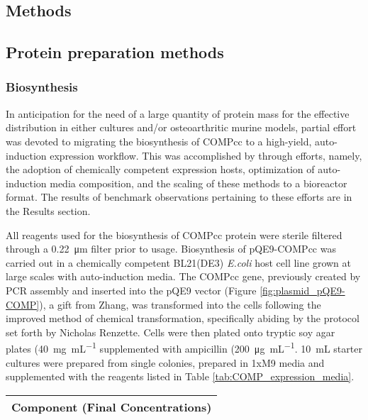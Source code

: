 \begin{refsection}
\section{Methods}

\subsection{Protein preparation methods}

\subsubsection{Biosynthesis}

In anticipation for the need of a large quantity of protein mass for the
effective distribution in either  cultures and/or 
osteoarthritic murine models, partial effort was devoted to migrating the
biosynthesis of COMPcc to a high-yield, auto-induction expression workflow. This
was accomplished by through efforts, namely, the adoption of 
chemically competent expression hosts, optimization of auto-induction media
composition, and the scaling of these methods to a bioreactor format. The
results of benchmark observations pertaining to these efforts are in the Results
section.

All reagents used for the biosynthesis of COMPcc protein were sterile filtered
through a \SI{0.22}{\um} filter prior to usage. Biosynthesis of pQE9-COMPcc was
carried out in a chemically competent BL21(DE3) \emph{E.coli} host cell line
grown at large scales with auto-induction media.  The COMPcc gene, previously
created by PCR assembly and inserted into the pQE9 vector (Figure
\ref{fig:plasmid_pQE9-COMP}), a gift from Zhang,\cite{Shen2006a} was transformed
into the cells following the improved  method of chemical
transformation, specifically abiding by the protocol set forth by Nicholas
Renzette.\cite{Renzette2011} Cells were then plated onto tryptic soy agar plates
(\SI{40}{\mg\per\mL} supplemented with ampicillin (\SI{200}{\ug\per\mL}.
\SI{10}{\mL} starter cultures were prepared from single colonies, prepared in
1xM9 media and supplemented with the reagents listed in Table
\ref{tab:COMP_expression_media}.
\begin{table}[h!]
    \centering
\begin{tabular}{ ll }
  \hline
  \multicolumn{2}{c}{Component (Final Concentrations)} \\
  \hline


\end{tabular}
\end{table}
\end{refsection}
